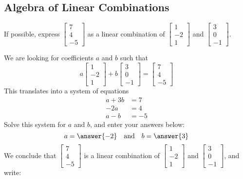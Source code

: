 \documentclass{ximera}
\begin{document}
\subsection*{Algebra of Linear Combinations}

\begin{example}\label{ex:lincombalgebra1}
If possible, express $\begin{bmatrix}7\\4\\-5\end{bmatrix}$ as a linear combination of $\begin{bmatrix}1\\-2\\1\end{bmatrix}$ and $\begin{bmatrix}3\\0\\-1\end{bmatrix}$.
\begin{explanation}
We are looking for coefficients $a$ and $b$ such that 
$$a\begin{bmatrix}1\\-2\\1\end{bmatrix}+b\begin{bmatrix}3\\0\\-1\end{bmatrix}=\begin{bmatrix}7\\4\\-5\end{bmatrix}$$
This translates into a system of equations
\begin{align*}
a+3b&=7\\
-2a&=4\\
a-b&=-5
\end{align*}
Solve this system for $a$ and $b$, and enter your answers below:
$$a=\answer{-2}\quad\text{and}\quad b=\answer{3}$$
We conclude that $\begin{bmatrix}7\\4\\-5\end{bmatrix}$ is a linear combination of $\begin{bmatrix}1\\-2\\1\end{bmatrix}$ and $\begin{bmatrix}3\\0\\-1\end{bmatrix}$, and write:

\end{explanation}
\end{example}
\end{document}

